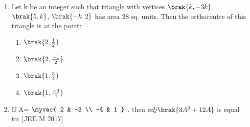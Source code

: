 \begin{enumerate}
	\item Let k be an integer such that triangle with vertices $\brak{k, -3k}$, $\brak{5,k}$, $\brak{-k,2}$ has area $28$ sq. units. Then the orthocentre of this triangle is at the point:
	\hfill{}
	\begin{enumerate}
	    	\item $\brak{2,\frac{1}{2}}$ 
	    	\item $\brak{2,\frac{-1}{2}}$ 
	     	\item $\brak{1,\frac{3}{4}}$ 
	    	\item $\brak{1,\frac{-3}{4}}$ 
	\end{enumerate}

\item If A= $\myvec{
    2 & -3 \\
    -4 & 1
}$
    , then $adj\brak{3A^2+12A}$ is equal to:
\hfill{[JEE M 2017]}
\begin{enumerate}
\end{enumerate}
\end{enumerate}
